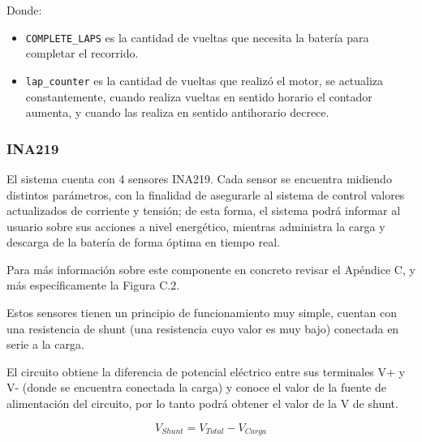                     Donde:\par
                    \begin{itemize} [label=•]
                \setlength{\itemindent}{1.5em}
                
                        \item \texttt{COMPLETE\_LAPS} es la cantidad de vueltas que necesita la batería para completar el recorrido.
                        \item \texttt{lap\_counter} es la cantidad de vueltas que realizó el motor, se actualiza constantemente, cuando realiza vueltas en sentido horario el contador aumenta, y cuando las realiza en sentido antihorario decrece.
                    \end{itemize}
                    
            \subsubsection{INA219}
                El sistema cuenta con 4 sensores INA219. Cada sensor se encuentra midiendo distintos parámetros, con la finalidad de asegurarle al sistema de control valores actualizados de corriente y tensión; de esta forma, el sistema podrá informar al usuario sobre sus acciones a nivel energético, mientras administra la carga y descarga de la batería de forma óptima en tiempo real.\par
                Para más información sobre este componente en concreto revisar el Apéndice C, y más específicamente la Figura C.2.\par

                    Estos sensores tienen un principio de funcionamiento muy simple, cuentan con una resistencia de shunt (una resistencia cuyo valor es muy bajo) conectada en serie a la carga.\par
                    El circuito obtiene la diferencia de potencial eléctrico entre sus terminales V+ y V- (donde se encuentra conectada la carga) y conoce el valor de la fuente de alimentación del circuito, por lo tanto podrá obtener el valor de la V de shunt.\par
                    
                        \begin{equation}
                            V_{Shunt} = V_{Total} - V_{Carga}
                        \end{equation}

